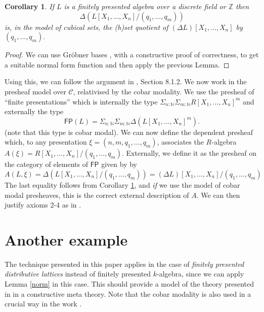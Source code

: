 \documentclass[10pt,a4paper]{article}
\newtheorem{corollary}[theorem]{Corollary}
\theoremstyle{definition}
\theoremstyle{remark}
\newcommand{\nats}{\mathbb{N}}
\newcommand{\ints}{\mathbb{Z}}
\newcommand{\CC}{\mathcal{C}}
\begin{document}

\begin{corollary}\label{quot}
  If $L$ is a finitely presented algebra over a discrete field or $\ints$ then
  \[
  \Delta (L[X_1,\dots,X_n]/(q_1,\dots,q_m))
  \]
  is, in the model of cubical sets, the (h)set quotient
  of $(\Delta L)[X_1,\dots,X_n]$ by $(q_1,\dots,q_m).$
\end{corollary}

\begin{proof}
  We can use Gr\"obner bases \cite{yengui2006}, with a constructive proof of correctness, to get a suitable normal form function
  and then apply the previous Lemma.
\end{proof}

\newcommand{\FP}{\mathsf{FP}}
\newcommand{\UU}{\mathcal{U}}

Using this, we can follow the argument in \cite{draft}, Section 8.1.2. We now work in the presheaf
model over $\CC$, relativised by the cobar modality.
We use the presheaf of ``finite presentations'' which is internally the type
\(\Sigma_{n:\mathbb{N}}\Sigma_{m:\mathbb{N}}R[X_{1},\ldots,X_{n}]^{m}\) and externally the type
\[
\FP(L) = \Sigma_{n:\nats}\Sigma_{m:\nats}\Delta (L[X_1,\dots,X_n]^m).
\]
(note that this type is cobar modal).
We can now define the 
dependent presheaf which, to any presentation
$\xi = (n,m,q_1,\dots,q_m)$, associates the $R$-algebra $A(\xi) = R[X_1,\dots,X_n]/(q_1,\dots,q_m)$.
Externally, we define it as the presheaf on the category of elements of $\FP$ given by
by
\[
A(L,\xi) = \Delta (L[X_1,\dots,X_n]/(q_1,\dots,q_m)) = (\Delta L)[X_1,\dots,X_n]/(q_1,\dots,q_m)
\]
The last equality follows from Corollary \ref{quot}, and {\em if} we use the model of cobar modal presheaves, this is the correct
external description of $A$. We can then justify axioms 2-4 as in \cite{draft}.

\section{Another example}

The technique presented in this paper applies in the case of {\em finitely presented distributive lattices} instead of
finitely presented $k$-algebra, since we can apply Lemma \ref{norm} in this case. This should provide a model
of the theory presented in \cite{gratzer2024} in a constructive meta theory. Note that the cobar modality is also used
in a crucial way in the work \cite{weaver20}.



\end{document}
